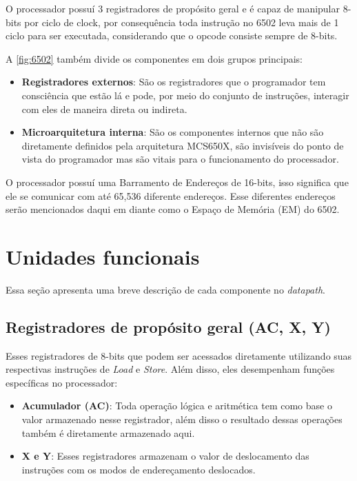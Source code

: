 \documentclass[
	12pt,				  %
	openright,		%
	a4paper,			%
	english,			%
	french,				%
	spanish,			%
	brazil,				%
]{abntex2}
\begin{document}
O processador possuí 3 registradores de propósito geral e é capaz de manipular
8-bits por ciclo de clock, por consequência toda instrução no 6502 leva mais de
1 ciclo para ser executada, considerando que o opcode consiste sempre de 8-bits.

A \autoref{fig:6502} também divide os componentes em dois grupos principais:
\begin{itemize}
	\item \textbf{Registradores externos}: São os registradores que o programador
	      tem consciência que estão lá e pode, por meio do conjunto de instruções,
	      interagir com eles de maneira direta ou indireta.
	\item \textbf{Microarquitetura interna}: São os componentes internos que não
	      são diretamente definidos pela arquitetura MCS650X, são invisíveis do
	      ponto de vista do programador mas são vitais para o funcionamento do
	      processador.
\end{itemize}

O processador possuí uma Barramento de Endereços de 16-bits, isso significa que
ele se comunicar com até 65,536 diferente endereços. Esse diferentes endereços
serão mencionados daqui em diante como o Espaço de Memória (EM) do 6502.

\section{Unidades funcionais}
Essa seção apresenta uma breve descrição de cada componente no \emph{datapath}.

\subsection{Registradores de propósito geral (AC, X, Y)}
Esses registradores de 8-bits que podem ser acessados diretamente utilizando
suas respectivas instruções de \emph{Load} e \emph{Store}. Além disso, eles
desempenham funções específicas no processador:
\begin{itemize}
	\item \textbf{Acumulador (AC)}: Toda operação lógica e aritmética tem como
	      base o valor armazenado nesse registrador, além disso o resultado dessas
	      operações também é diretamente armazenado aqui.
	\item \textbf{X e Y}: Esses registradores armazenam o valor de deslocamento
	      das instruções com os modos de endereçamento deslocados.
\end{itemize}
\end{document}
